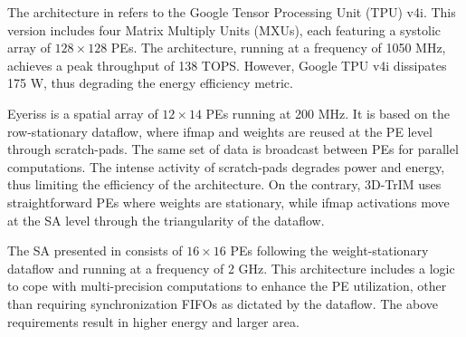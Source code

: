 The architecture in \cite{Jouppi_21} refers to the Google Tensor Processing Unit (TPU) v4i. This version includes four Matrix Multiply Units (MXUs), each featuring a systolic array of $128\times128$ PEs. The architecture, running at a frequency of 1050 MHz, achieves a peak throughput of 138 TOPS. However, Google TPU v4i dissipates 175 W, thus degrading the energy efficiency metric.

Eyeriss\cite{Chen_17} is a spatial array of $12\times14$ PEs running at 200 MHz. It is based on the row-stationary dataflow, where ifmap and weights are reused at the PE level through scratch-pads. The same set of data is broadcast between PEs for parallel computations. The intense activity of scratch-pads degrades power and energy, thus limiting the efficiency of the architecture. On the contrary, 3D-TrIM uses straightforward PEs where weights are stationary, while ifmap activations move at the SA level through the triangularity of the dataflow.

The SA presented in \cite{Feng_24} consists of $16 \times 16$ PEs following the weight-stationary dataflow and running at a frequency of 2 GHz. This architecture includes a logic to cope with multi-precision computations to enhance the PE utilization, other than requiring synchronization FIFOs as dictated by the dataflow. The above requirements result in higher energy and larger area.